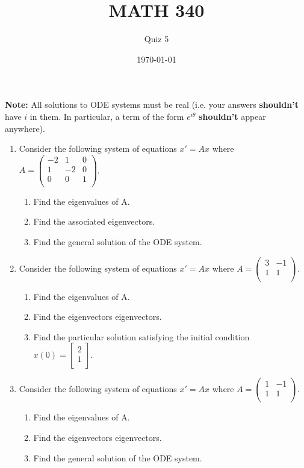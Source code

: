 \documentclass{article}
\begin{document}
\title{MATH 340}
\author{Quiz 5}
\date{\today}
\maketitle

\textbf{Note:} All solutions to ODE systems must be real (i.e. your answers
\textbf{shouldn't} have $i$ in them. In particular, a term of the form
$e^{i\theta}$ \textbf{shouldn't} appear anywhere).

\begin{enumerate}

\item Consider the following system of equations $x'=Ax$ where $
	A=\begin{pmatrix}
		-2 &  1 & 0\\
		 1 & -2 & 0\\
		 0 &  0 & 1\\
	\end{pmatrix}
$.

\begin{enumerate}
	\item Find the eigenvalues of A.
	\item Find the associated eigenvectors.
	\item Find the general solution of the ODE system.
\end{enumerate}

\item Consider the following system of equations $x'=Ax$ where $
	A=\begin{pmatrix}
		 3 & -1\\
		 1 & 1\\
	\end{pmatrix}
$.

\begin{enumerate}
	\item Find the eigenvalues of A.
	\item Find the eigenvectors eigenvectors.
	\item Find the particular solution satisfying the initial condition $x(0)=\begin{bmatrix}
			2\\
			1\\
	\end{bmatrix}$.
\end{enumerate}

\item Consider the following system of equations $x'=Ax$ where $
	A=\begin{pmatrix}
		 1 & -1\\
		 1 & 1\\
	\end{pmatrix}
$.

\begin{enumerate}
	\item Find the eigenvalues of A.
	\item Find the eigenvectors eigenvectors.
	\item Find the general solution of the ODE system.
\end{enumerate}

\end{enumerate}
\end{document}
